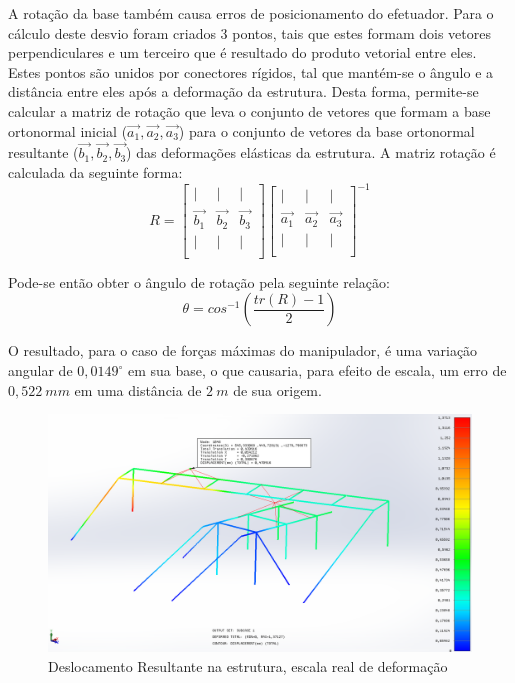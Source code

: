 A rotação da base também causa erros de posicionamento do efetuador. Para o
cálculo deste desvio foram criados 3 pontos, tais que estes formam dois
vetores perpendiculares e um terceiro que é resultado do produto vetorial entre eles.
Estes pontos são unidos por conectores rígidos, tal que mantém-se o ângulo e a
distância entre eles após a deformação da estrutura. Desta forma, permite-se
calcular a matriz de rotação que leva o conjunto de vetores que formam a base
ortonormal inicial ($\vec{a_1},\vec{a_2},\vec{a_3}$) para o conjunto de
vetores da base ortonormal resultante ($\vec{b_1},\vec{b_2},\vec{b_3}$) das
deformações elásticas da estrutura. A matriz rotação é calculada da seguinte forma:
\begin{equation*}
R=
\begin{bmatrix}
	    |   &       |   &      |      \\
	\vec{b_1} & \vec{b_2} & \vec{b_3} \\
	    |   &       |   &      |      \\
\end{bmatrix}
\begin{bmatrix}
	    |   &       |   &      |      \\
	\vec{a_1} & \vec{a_2} & \vec{a_3} \\
	    |   &       |   &      |      \\
\end{bmatrix} ^{-1}
\end{equation*}

Pode-se então obter o ângulo de rotação pela seguinte relação:
\begin{equation*}
	\theta=cos^{-1} \left(\frac{tr(R)-1}{2}\right)
\end{equation*}

O resultado, para o caso de forças máximas do manipulador, é uma variação
angular de $0,0149^{\circ}$ em sua base, o que causaria, para efeito de
escala, um erro de $0,522~mm$ em uma distância de $2~m$ de sua origem.


\begin{figure}[h!]
	\centering
	\includegraphics[width=0.9\columnwidth]{method/figs/dimensionamento/deslocamento}
	\caption{Deslocamento Resultante na estrutura, escala real de
	deformação}
    \label{fig::deslocamento}
\end{figure}


